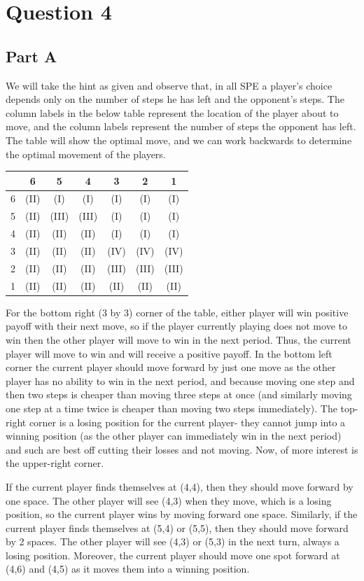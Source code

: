\documentclass[11pt]{article} %
\begin{document}
\section{Question 4}
\subsection{Part A}
We will take the hint as given and observe that, in all SPE a player's choice depends only on the number of steps he has left and the opponent's steps. The column labels in the below table represent the location of the player about to move, and the column labels represent the number of steps the opponent has left. The table will show the optimal move, and we can work backwards to determine the optimal movement of the players.
\begin{center}
\begin{tabular}{r | c c c c c c }
& 6&5&4&3&2&1\\
\hline
6 &(II) & (I) & (I) & (I) &(I) &(I)\\
5&(II) & (III) & (III) & (I) &(I) &(I)\\
4&(II) & (II) &(II) & (I) &(I) &(I)\\
3&(II) & (II) & (II) &(IV)&(IV)&(IV)\\
2 &(II) &(II) & (II) &(III)&(III)&(III)\\
1&(II)&(II)&(II)&(II)&(II)&(II)
\end{tabular}
\end{center}
For the bottom right (3 by 3) corner of the table, either player will win positive payoff with their next move, so if the player currently playing does not move to win then the other player will move to win in the next period. Thus, the current player will move to win and will receive a positive payoff. In the bottom left corner the current player should move forward by just one move as the other player has no ability to win in the next period, and because moving one step and then two steps is cheaper than moving three steps at once (and similarly moving one step at a time twice is cheaper than moving two steps immediately). The top-right corner is a losing position for the current player- they cannot jump into a winning position (as the other player can immediately win in the next period) and such are best off cutting their losses and not moving. Now, of more interest is the upper-right corner.

If the current player finds themselves at (4,4), then they should move forward by one space. The other player will see (4,3) when they move, which is a losing position, so the current player wins by moving forward one space. Similarly, if the current player finds themselves at (5,4) or (5,5), then they should move forward by 2 spaces. The other player will see (4,3) or (5,3) in the next turn, always a losing position. Moreover, the current player should move one spot forward at (4,6) and (4,5) as it moves them into a winning position.   
\end{document}
